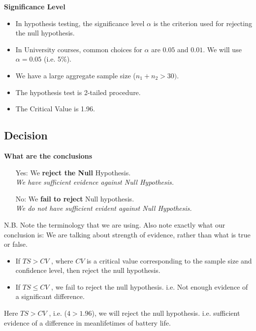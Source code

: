 \documentclass[a4paper,12pt]{article}
\begin{document}
\noindent \textbf{Significance Level}

\begin{itemize}
\item In hypothesis testing, the significance level $\alpha$ is the criterion used for rejecting the null hypothesis. 

\item In University courses, common choices for $\alpha$ are $0.05$ and $0.01$. We will use $\alpha =0.05$ (i.e. 5\%).
\item We have a large aggregate sample size ($n_1 + n_2 > 30)$.
\item The hypothesis test is 2-tailed procedure.
\item The Critical Value is 1.96.
\end{itemize}


\newpage 
\subsection*{Decision}



\begin{framed}
\noindent \textbf{What are the conclusions}
\begin{itemize} 

\item[Yes:] We \textbf{reject the Null} Hypothesis. \\ \textit{We have sufficient evidence against Null Hypothesis.}

\item[No:] We \textbf{fail to reject} Null hypothesis. \\ \textit{We do not have sufficient evident against Null Hypothesis.}
\end{itemize}
{\normalsize
N.B. Note the terminology that we are using. Also note exactly what our conclusion is: We are talking about strength of evidence, rather than what is true or false.}

\end{framed}
\smallskip
\begin{framed}
\begin{itemize}
\item If $TS > CV$ , where $CV$ is a critical value corresponding to the sample size and confidence level, then reject the null hypothesis. 
\item  If $TS \leq CV$ , we fail to reject the null hypothesis. i.e. Not enough evidence of a significant difference. 
\end{itemize}
\end{framed}

\noindent Here $TS >CV$ , i.e. ($4 > 1.96$), we will reject the null hypothesis. i.e. sufficient evidence of a difference in meanlifetimes of battery life. 
\end{document}
